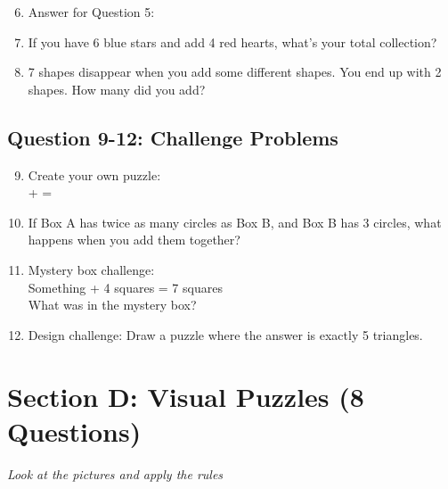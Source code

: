 \documentclass{article}
\begin{document}
\begin{enumerate}
    \setcounter{enumi}{5}
    \item Answer for Question 5: \underline{\hspace{6cm}}
    \item If you have 6 blue stars and add 4 red hearts, what's your total collection? \\
          \underline{\hspace{8cm}}
    \item 7 shapes disappear when you add some different shapes. You end up with 2 shapes. How many did you add? \underline{\hspace{4cm}}
\end{enumerate}

\subsection*{Question 9-12: Challenge Problems}

\begin{enumerate}
    \setcounter{enumi}{8}
    \item Create your own puzzle: \\
          \underline{\hspace{4cm}} + \underline{\hspace{4cm}} = \underline{\hspace{4cm}}
    
    \item If Box A has twice as many circles as Box B, and Box B has 3 circles, what happens when you add them together? \\
          \underline{\hspace{8cm}}
    
    \item Mystery box challenge: \\
          Something + 4 squares = 7 squares \\
          What was in the mystery box? \underline{\hspace{4cm}}
    
    \item Design challenge: Draw a puzzle where the answer is exactly 5 triangles.
\end{enumerate}

\vspace{3cm}

\section{Section D: Visual Puzzles (8 Questions)}
\textit{Look at the pictures and apply the rules}
\end{document}

